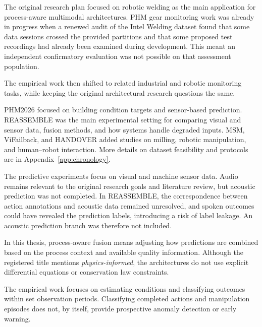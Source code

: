 The original research plan focused on robotic welding as the main
application for process-aware multimodal architectures. PHM gear
monitoring work was already in progress when a renewed audit of
the Intel Welding dataset found that some data sessions crossed
the provided partitions and that some proposed test recordings
had already been examined during development. This meant an
independent confirmatory evaluation was not possible on that
assessment population.

The empirical work then shifted to related industrial and robotic
monitoring tasks, while keeping the original architectural research
questions the same.

{}

{}

PHM2026 focused on building condition targets and sensor-based
prediction. REASSEMBLE was the main experimental setting for
comparing visual and sensor data, fusion methods, and how systems
handle degraded inputs. MSM, ViFailback, and HANDOVER added studies
on milling, robotic manipulation, and human--robot interaction.
More details on dataset feasibility and protocols are in
Appendix~\ref{app:chronology}.

The predictive experiments focus on visual and machine sensor
data. Audio remains relevant to the original research goals and
literature review, but acoustic prediction was not completed.
In REASSEMBLE, the correspondence between action annotations and
acoustic data remained unresolved, and spoken outcomes could have
revealed the prediction labels, introducing a risk of label leakage.
An acoustic prediction branch was therefore not included.

{}

In this thesis, process-aware fusion means adjusting how predictions
are combined based on the process context and available quality
information. Although the registered title mentions
\textit{physics-informed}, the architectures do not use explicit
differential equations or conservation law constraints.

The empirical work focuses on estimating conditions and classifying
outcomes within set observation periods. Classifying completed
actions and manipulation episodes does not, by itself, provide
prospective anomaly detection or early warning.

